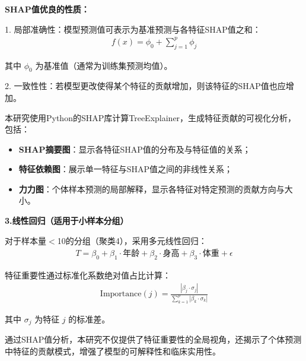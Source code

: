 \documentclass{article}
\begin{document}
\textbf{SHAP值优良的性质：}

1. 局部准确性：模型预测值可表示为基准预测与各特征SHAP值之和：
\begin{gather}
    f(x) = \phi_0 + \sum_{j=1}^{p} \phi_j \tag{23}
\end{gather}

其中 $ \phi_0 $ 为基准值（通常为训练集预测均值）。

2. 一致性性：若模型更改使得某个特征的贡献增加，则该特征的SHAP值也应增加。

本研究使用Python的SHAP库计算TreeExplainer，生成特征贡献的可视化分析，包括：
\begin{itemize}
    \item \textbf{SHAP摘要图}：显示各特征SHAP值的分布及与特征值的关系；
    \item \textbf{特征依赖图}：展示单一特征与SHAP值之间的非线性关系；
    \item \textbf{力力图}：个体样本预测的局部解释，显示各特征对特定预测的贡献方向与大小。
\end{itemize}

\textbf{3.线性回归（适用于小样本分组）}

对于样本量$<$10的分组（聚类4），采用多元线性回归：
\begin{gather}
    T = \beta_0 + \beta_1 \cdot \text{年龄} + \beta_2 \cdot \text{身高} + \beta_3 \cdot \text{体重} + \epsilon \tag{24}
\end{gather}

特征重要性通过标准化系数绝对值占比计算：
\begin{gather}
    \text{Importance}(j) = \frac{|\beta_j \cdot \sigma_j|}{\sum_{k=1}^{p} |\beta_k \cdot \sigma_k|} \tag{25}
\end{gather}

其中 $ \sigma_j $ 为特征 $ j $ 的标准差。

通过SHAP值分析，本研究不仅提供了特征重要性的全局视角，还揭示了个体预测中特征的贡献模式，增强了模型的可解释性和临床实用性。
\end{document}
